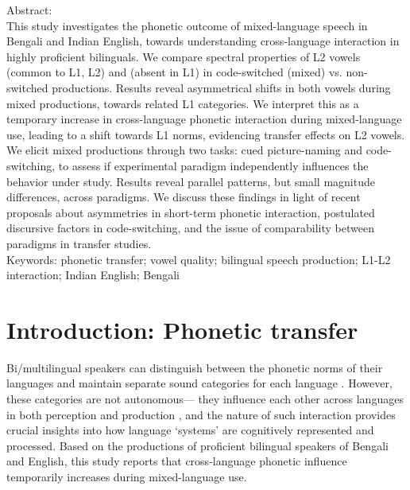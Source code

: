 \documentclass[12 pt]{article}
\newcommand{\nt}[1]{\textipa{[#1]}} %
\newlength\mystoreparindent
\newenvironment{myparindent}[1]{%
	\setlength{\mystoreparindent}{\the\parindent}
	\setlength{\parindent}{#1}
}{%
	\setlength{\parindent}{\mystoreparindent}
}
\begin{document}
\newpage
\begin{myparindent}{0pt}
Abstract:\\
This study investigates the phonetic outcome of mixed-language speech in Bengali and Indian English, towards understanding cross-language interaction in highly proficient bilinguals.  We compare spectral properties of L2 vowels \nt{\ae} (common to L1, L2) and \nt{2} (absent in L1) in code-switched (mixed) vs. non-switched productions. Results reveal asymmetrical shifts in both vowels during mixed productions, towards related L1 categories. We interpret this as a temporary increase in cross-language phonetic interaction during mixed-language use, leading to a shift towards L1 norms, evidencing transfer effects on L2 vowels. We elicit mixed productions through two tasks: cued picture-naming and code-switching, to assess if experimental paradigm independently influences the behavior under study. Results reveal parallel patterns, but small magnitude differences, across paradigms. We discuss these findings in light of recent proposals about asymmetries in short-term phonetic interaction, postulated discursive factors in code-switching, and the issue of comparability between paradigms in transfer studies. \\


Keywords: phonetic transfer; vowel quality; bilingual speech production; L1-L2 interaction; Indian English; Bengali 

\end{myparindent}

\newpage

\section{Introduction: Phonetic transfer}\label{introduction}

Bi/multilingual speakers can distinguish between the phonetic norms of their languages and maintain separate sound categories for each language \citep{caramazza1973acquisition,macleod2010impact,bosch2003simultaneous}. However, these categories are not autonomous--- they influence each other across languages in both perception and production \citep[e.g.][]{flege1995second,fowler2008cross,flege2002assessing}, and the nature of such interaction provides crucial insights into how language `systems' are cognitively represented and processed. Based on the productions of proficient bilingual speakers of Bengali and English, this study reports that cross-language phonetic influence temporarily increases during mixed-language use.%
\end{document}
